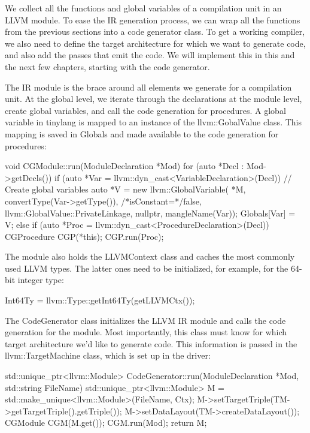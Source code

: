 
We collect all the functions and global variables of a compilation unit in an LLVM module. To ease the IR generation process, we can wrap all the functions from the previous sections into a code generator class. To get a working compiler, we also need to define the target architecture for which we want to generate code, and also add the passes that emit the code. We will implement this in this and the next few chapters, starting with the code generator.


The IR module is the brace around all elements we generate for a compilation unit. At the global level, we iterate through the declarations at the module level, create global variables, and call the code generation for procedures. A global variable in tinylang is mapped to an instance of the llvm::GobalValue class. This mapping is saved in Globals and made available to the code generation for procedures:

\begin{cpp}
void CGModule::run(ModuleDeclaration *Mod) {
    for (auto *Decl : Mod->getDecls()) {
        if (auto *Var =
                llvm::dyn_cast<VariableDeclaration>(Decl)) {
            // Create global variables
            auto *V = new llvm::GlobalVariable(
                *M, convertType(Var->getType()),
                /*isConstant=*/false,
                llvm::GlobalValue::PrivateLinkage, nullptr,
                mangleName(Var));
            Globals[Var] = V;
        } else if (auto *Proc =
            llvm::dyn_cast<ProcedureDeclaration>(Decl)) {
            CGProcedure CGP(*this);
            CGP.run(Proc);
        }
    }
}
\end{cpp}

The module also holds the LLVMContext class and caches the most commonly used LLVM types. The latter ones need to be initialized, for example, for the 64-bit integer type:

\begin{cpp}
Int64Ty = llvm::Type::getInt64Ty(getLLVMCtx());
\end{cpp}

The CodeGenerator class initializes the LLVM IR module and calls the code generation for the module. Most importantly, this class must know for which target architecture we’d like to generate code. This information is passed in the llvm::TargetMachine class, which is set up in the driver:

\begin{cpp}
std::unique_ptr<llvm::Module>
CodeGenerator::run(ModuleDeclaration *Mod,
                   std::string FileName) {
    std::unique_ptr<llvm::Module> M =
        std::make_unique<llvm::Module>(FileName, Ctx);
    M->setTargetTriple(TM->getTargetTriple().getTriple());
    M->setDataLayout(TM->createDataLayout());
    CGModule CGM(M.get());
    CGM.run(Mod);
    return M;
}
\end{cpp}

